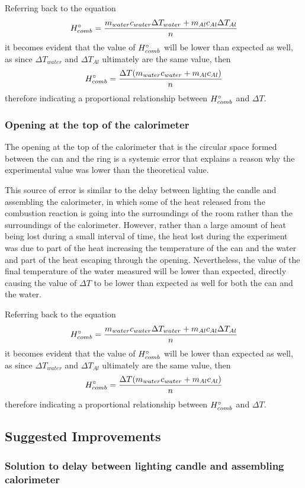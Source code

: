 \documentclass[
	letterpaper, %
	12pt, %
]{CSUniSchoolLabReport}
\begin{document}
Referring back to the equation
$$
  H\degree_{comb} = \frac{m_{water}c_{water}\Delta T_{water} + m_{Al}c_{Al}\Delta T_{Al}}{n}
$$
it becomes evident that the value of $H\degree_{comb}$ will be lower than expected as well, as since
$\Delta T_{water}$ and $\Delta T_{Al}$ ultimately are the same value, then
$$
  H\degree_{comb} = \frac{\Delta T(m_{water}c_{water} + m_{Al}c_{Al})}{n}
$$
therefore indicating a proportional relationship between $H\degree_{comb}$ and $\Delta T$.

\subsubsection{Opening at the top of the calorimeter}

The opening at the top of the calorimeter that is the circular space formed between the can
and the ring is a systemic error that explains a reason why the experimental value was lower than
the theoretical value.

This source of error is similar to the delay between lighting the candle and assembling the
calorimeter, in which some of the heat released from the combustion reaction is going into the
surroundings of the room rather than the surroundings of the calorimeter. However, rather than
a large amount of heat being lost during a small interval of time, the heat lost during
the experiment was due to part of the heat increasing the temperature of the can and the
water and part of the heat escaping through the opening. Nevertheless, the value of
the final temperature of the water measured will be lower than expected, directly causing the value of
$\Delta T$ to be lower than expected as well for both the can and the water.

Referring back to the equation
$$
  H\degree_{comb} = \frac{m_{water}c_{water}\Delta T_{water} + m_{Al}c_{Al}\Delta T_{Al}}{n}
$$
it becomes evident that the value of $H\degree_{comb}$ will be lower than expected as well, as since
$\Delta T_{water}$ and $\Delta T_{Al}$ ultimately are the same value, then
$$
  H\degree_{comb} = \frac{\Delta T(m_{water}c_{water} + m_{Al}c_{Al})}{n}
$$
therefore indicating a proportional relationship between $H\degree_{comb}$ and $\Delta T$.

\subsection{Suggested Improvements}

\subsubsection{Solution to delay between lighting candle and assembling calorimeter}
\end{document}
